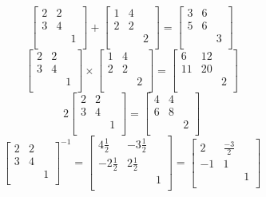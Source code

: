 \begin{example}
  $$\begin{bmatrix}
    2 & 2 & \\ 
    3 & 4 & \\
    & & 1 \\
  \end{bmatrix} + \begin{bmatrix}
    1 & 4 & \\ 
    2 & 2 & \\
    & & 2 \\
  \end{bmatrix} = \begin{bmatrix}
    3 & 6 & \\ 
    5 & 6 & \\
    & & 3 \\
  \end{bmatrix}$$
  $$\begin{bmatrix}
    2 & 2 & \\ 
    3 & 4 & \\
    & & 1 \\
  \end{bmatrix} \times \begin{bmatrix}
    1 & 4 & \\ 
    2 & 2 & \\
    & & 2 \\
  \end{bmatrix} = \begin{bmatrix}
    6 & 12 & \\ 
    11 & 20 & \\
    & & 2 \\
  \end{bmatrix}$$
  $$2\begin{bmatrix}
    2 & 2 & \\ 
    3 & 4 & \\
    & & 1 \\
  \end{bmatrix} = \begin{bmatrix}
    4 & 4 & \\ 
    6 & 8 & \\
    & & 2 \\
  \end{bmatrix}$$
  $$\begin{bmatrix}
    2 & 2 & \\ 
    3 & 4 & \\
    & & 1 \\
  \end{bmatrix}^{-1} = \begin{bmatrix}
    4\frac{1}{2} & -3\frac{1}{2} & \\ 
    -2\frac{1}{2} & 2\frac{1}{2} & \\
    & & 1 \\
  \end{bmatrix} = \begin{bmatrix}
    2 & \frac{-3}{2} & \\ 
    -1 & 1 & \\
    & & 1 \\
  \end{bmatrix}$$
\end{example}

